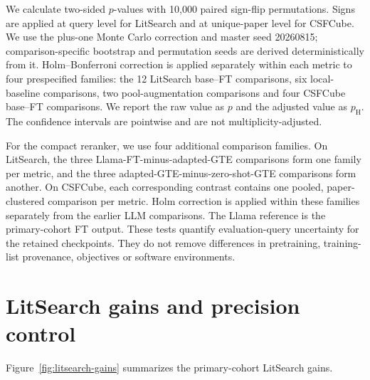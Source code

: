 \documentclass[pdflatex,sn-basic,Numbered]{sn-jnl}%
\theoremstyle{thmstyleone}%
\theoremstyle{thmstyletwo}%
\theoremstyle{thmstylethree}%
\begin{document}
We calculate two-sided $p$-values with 10,000 paired sign-flip permutations.
Signs are applied at query level for LitSearch and at unique-paper level for
CSFCube. We use the plus-one Monte Carlo correction and master seed 20260815;
comparison-specific bootstrap and permutation seeds are derived
deterministically from it. Holm--Bonferroni correction is applied separately
within each metric to four prespecified families: the 12 LitSearch base--FT
comparisons, six local-baseline comparisons, two pool-augmentation comparisons
and four CSFCube base--FT comparisons. We report the raw value as $p$ and the
adjusted value as $p_{\mathrm{H}}$. The confidence intervals are pointwise and
are not multiplicity-adjusted.

For the compact reranker, we use four additional comparison families. On
LitSearch, the three Llama-FT-minus-adapted-GTE comparisons form one family
per metric, and the three adapted-GTE-minus-zero-shot-GTE comparisons form
another. On CSFCube, each corresponding contrast contains one pooled,
paper-clustered comparison per metric. Holm correction is applied within these
families separately from the earlier LLM comparisons. The Llama reference is the
primary-cohort FT output. These tests quantify evaluation-query uncertainty for
the retained checkpoints. They do not remove differences in pretraining,
training-list provenance, objectives or software environments.

\FloatBarrier
\section{LitSearch gains and precision control}
\label{supp:precision}

Figure~\ref{fig:litsearch-gains} summarizes the primary-cohort LitSearch gains.
\end{document}
